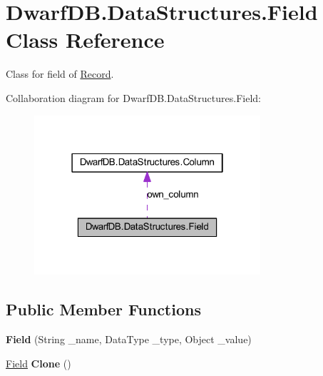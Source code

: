 \hypertarget{class_dwarf_d_b_1_1_data_structures_1_1_field}{
\section{DwarfDB.DataStructures.Field Class Reference}
\label{class_dwarf_d_b_1_1_data_structures_1_1_field}
}


Class for field of \hyperlink{class_dwarf_d_b_1_1_data_structures_1_1_record}{Record}.  




Collaboration diagram for DwarfDB.DataStructures.Field:\nopagebreak
\begin{figure}[H]
\begin{center}
\leavevmode
\includegraphics[width=238pt]{class_dwarf_d_b_1_1_data_structures_1_1_field__coll__graph}
\end{center}
\end{figure}
\subsection*{Public Member Functions}
\begin{DoxyCompactItemize}
\item 
\hypertarget{class_dwarf_d_b_1_1_data_structures_1_1_field_af89ec8a20b69b0f52e56c7730eb8127a}{
{\bfseries Field} (String \_\-name, DataType \_\-type, Object \_\-value)}
\label{class_dwarf_d_b_1_1_data_structures_1_1_field_af89ec8a20b69b0f52e56c7730eb8127a}

\item 
\hypertarget{class_dwarf_d_b_1_1_data_structures_1_1_field_a4772b2645a7b03be6800261db6a3c816}{
\hyperlink{class_dwarf_d_b_1_1_data_structures_1_1_field}{Field} {\bfseries Clone} ()}
\label{class_dwarf_d_b_1_1_data_structures_1_1_field_a4772b2645a7b03be6800261db6a3c816}

\end{DoxyCompactItemize}
